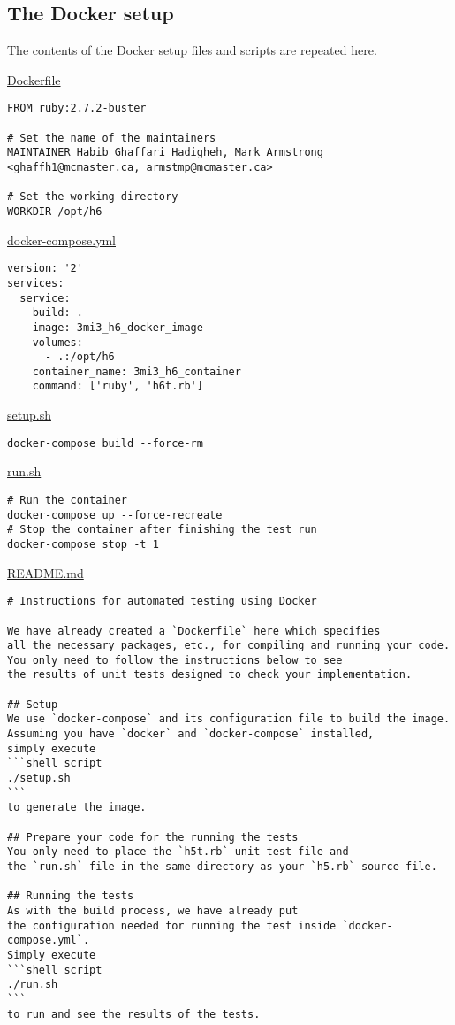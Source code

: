 \documentclass[11pt]{article}
\begin{document}
\subsection*{The Docker setup}
\label{sec:orgb0e58e2}
The contents of the Docker setup files and scripts are repeated here.

\href{./testing/h5/Dockerfile}{Dockerfile}
\begin{verbatim}
FROM ruby:2.7.2-buster

# Set the name of the maintainers
MAINTAINER Habib Ghaffari Hadigheh, Mark Armstrong <ghaffh1@mcmaster.ca, armstmp@mcmaster.ca>

# Set the working directory
WORKDIR /opt/h6
\end{verbatim}

\href{./testing/h5/docker-compose.yml}{docker-compose.yml}
\begin{verbatim}
version: '2'
services:
  service:
    build: .
    image: 3mi3_h6_docker_image
    volumes:
      - .:/opt/h6
    container_name: 3mi3_h6_container
    command: ['ruby', 'h6t.rb']
\end{verbatim}

\href{./testing/h5/setup.sh}{setup.sh}
\begin{verbatim}
docker-compose build --force-rm
\end{verbatim}

\href{./testing/h5/run.sh}{run.sh}
\begin{verbatim}
# Run the container
docker-compose up --force-recreate
# Stop the container after finishing the test run
docker-compose stop -t 1
\end{verbatim}

\href{./testing/h5/README.md}{README.md}
\begin{verbatim}
# Instructions for automated testing using Docker

We have already created a `Dockerfile` here which specifies
all the necessary packages, etc., for compiling and running your code.
You only need to follow the instructions below to see 
the results of unit tests designed to check your implementation.

## Setup
We use `docker-compose` and its configuration file to build the image.
Assuming you have `docker` and `docker-compose` installed,
simply execute
```shell script
./setup.sh
```
to generate the image.

## Prepare your code for the running the tests
You only need to place the `h5t.rb` unit test file and
the `run.sh` file in the same directory as your `h5.rb` source file.

## Running the tests
As with the build process, we have already put
the configuration needed for running the test inside `docker-compose.yml`.
Simply execute
```shell script
./run.sh
```
to run and see the results of the tests.
\end{verbatim}
\end{document}
